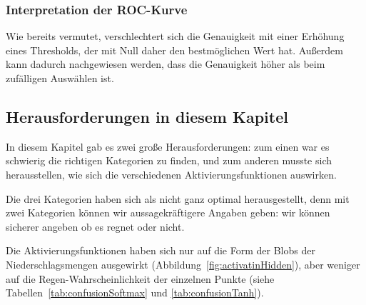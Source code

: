 \subsubsection{Interpretation der ROC-Kurve}
Wie bereits vermutet, verschlechtert sich die Genauigkeit mit einer Erhöhung eines Thresholds, der mit Null daher den bestmöglichen Wert hat.
Außerdem kann dadurch nachgewiesen werden, dass die Genauigkeit höher als beim zufälligen Auswählen ist.

\subsection{Herausforderungen in diesem Kapitel}
In diesem Kapitel gab es zwei große Herausforderungen: zum einen war es schwierig die richtigen Kategorien zu finden, und zum anderen musste sich herausstellen, wie sich die verschiedenen Aktivierungsfunktionen auswirken.

Die drei Kategorien haben sich als nicht ganz optimal herausgestellt, denn mit zwei Kategorien können wir aussagekräftigere Angaben geben: wir können sicherer angeben ob es regnet oder nicht.

Die Aktivierungsfunktionen haben sich nur auf die Form der Blobs der Niederschlagsmengen ausgewirkt (Abbildung~\ref{fig:activatinHidden}), aber weniger auf die Regen-Wahrscheinlichkeit der einzelnen Punkte (siehe Tabellen~\ref{tab:confusionSoftmax} und \ref{tab:confusionTanh}).
